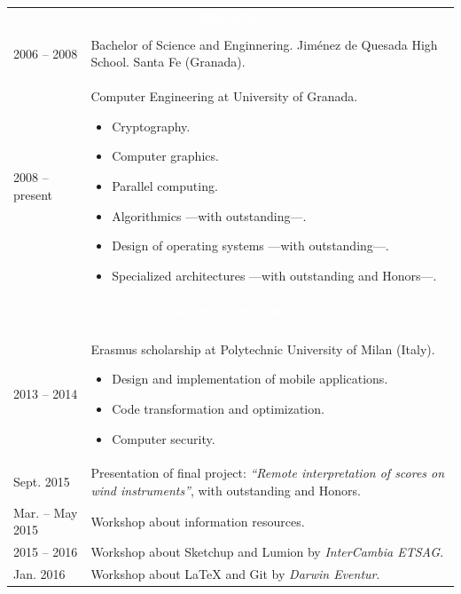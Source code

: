 \documentclass[12pt,a4paper]{article}
\newcommand{\header}[1]{\multicolumn{2}{c}{\cellcolor{black} \textcolor{white} {#1}} \\}
\begin{document}
	\begin{tabular}{p{}p{}}
		\\
		\header{\textbf{Education}}
		\\
		2006 -- 2008 & Bachelor of Science and Enginnering. \newline
		Jiménez de Quesada High School. Santa Fe (Granada). \\
		2008 -- present & Computer Engineering at University of Granada.
		\begin{itemize} \itemsep 0pt \parskip 0pt
			\item Cryptography.
			\item Computer graphics.
			\item Parallel computing.
			\item Algorithmics ---with outstanding---.
			\item Design of operating systems ---with outstanding---.
			\item Specialized architectures ---with outstanding and Honors---.
		\end{itemize}
		\\
		\header{\textbf{University experience}}
		\\
		2013 -- 2014 & Erasmus scholarship at Polytechnic University of Milan
		(Italy).
		\begin{itemize} \itemsep 0pt \parskip 0pt
			\item Design and implementation of mobile applications.
			\item Code transformation and optimization.
			\item Computer security.
		\end{itemize} \\
		Sept. 2015 & Presentation of final project: \textit{``Remote 
		interpretation of scores on wind instruments''}, with outstanding and 
		Honors. \\
		Mar. -- May 2015 & Workshop about information resources. \\
		2015 -- 2016 & Workshop about Sketchup and Lumion by \textit{InterCambia 
		ETSAG}. \\
		Jan. 2016 & Workshop about LaTeX and Git by \textit{Darwin Eventur}. \\
		\end{tabular}
		
\end{document}
